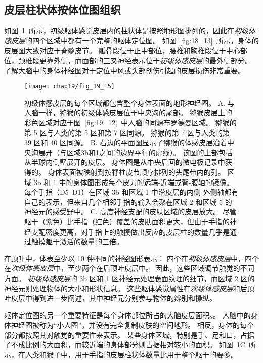 \subsection{皮层柱状体按体位图组织}

如图~\ref{fig:19_15}~所示，初级躯体感觉皮层内的柱状体是按照地形图排列的，因此在\textit{初级体感皮层}的四个区域中都有一个完整的躯体定位图。
如图~\ref{fig:18_13}~所示，身体的皮层图大致对应于脊髓皮节。
骶骨段位于正中部位，腰椎和胸椎段位于中心部位，颈椎段更靠外侧，而面部的三叉神经表示位于\textit{初级体感皮层}的最外侧部分。
了解大脑中的身体神经图对于定位中风或头部创伤引起的皮层损伤非常重要。


\begin{figure}[htbp]
	\centering
	\texttt{[image: chap19/fig\_19\_15]}
	\caption{初级体感皮层的每个区域都包含整个身体表面的地形神经图\cite{nelson1980representations}。
		A. 与人脑一样，猕猴的初级体感皮层位于中央沟的尾部。
		猕猴皮层上的彩色区域对应于图~\ref{fig:19_12}~中人脑的同源布罗德曼区域。
		猕猴的第 5 区与人类的第 5 区和第 7 区同源。
		猕猴的第 7 区与人类的第 39 区和 40 区同源。
		B. 右边的平面图显示了猕猴的体感皮层沿着中央沟展开（与区域3b和1之间的边界平行的虚线）。
		该图的上部包括从半球内侧壁展开的皮层。
		身体图是从中央后回的微电极记录中获得的。
		身体表面被映射到按脊柱皮节顺序排列的头尾带内的列。
		区域 3b 和 1 中的身体图形成每个皮刀的远端-近端或背-腹轴的镜像。
		每个手指（D5–D1）在区域 3b 和区域 1 中沿皮层的内侧-外侧轴都有自己的表示，但来自几个相邻手指的输入会聚在区域 2 和区域 5 的神经元的感受野中。
		C. 高度神经支配的皮肤区域的皮层放大。
		尽管躯干（紫色）比手指（红色）覆盖的皮肤面积更大，但由于手指的神经支配密度更高，对手指上的触摸做出反应的皮层柱的数量几乎是通过触摸躯干激活的数量的三倍。}
	\label{fig:19_15}
\end{figure}


在顶叶中，体表至少以 10 种不同的神经图形表示：
四个在\textit{初级体感皮层}中，四个在\textit{次级体感皮层}中，至少两个在后顶叶皮层中。
因此，这些区域调节触觉的不同方面。
\textit{初级体感皮层}的 3b 区和 1 区神经元处理表面纹理的细节，而区域 2 区的神经元则处理物体的大小和形状信息。
这些躯体感觉属性在\textit{次级体感皮层}和后顶叶皮层中得到进一步阐述，其中神经元分别参与物体的辨别和操纵。


躯体定位图的另一个重要特征是每个身体部位所占的大脑皮层面积。。
人脑中的身体神经图被称为“小人图”，并没有完全复制皮肤的空间地形。
相反，身体的每个部分都按照其对触觉的重要性来表示。 
某些身体区域，特别是手、足和口，占据了不成比例的大面积，而较近端的身体部分则占据相对较小的面积。
如图~\ref{fig:19_15}C~所示，在人类和猴子中，用于手指的皮层柱状体数量比用于整个躯干的要多。


